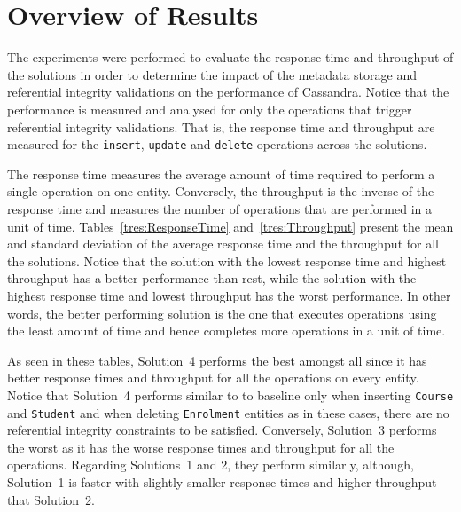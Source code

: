 \section{Overview of Results} \label{s:results-overview}


The experiments were performed to evaluate the response time and throughput of
the solutions in order to determine the impact of the metadata storage and
referential integrity validations on the performance of Cassandra. Notice that
the performance is measured and analysed for only the operations that trigger
referential integrity validations. That is, the response
time and throughput are measured for the \texttt{insert}, \texttt{update} and
\texttt{delete} operations across the solutions.

The response time measures the average amount of time required to perform a
single operation on one entity. Conversely,  the throughput is the inverse of
the response time and measures the number of operations that are performed in a
unit of time. Tables~\ref{tres:ResponseTime} and~\ref{tres:Throughput} present
the mean and standard deviation of the average response time and the throughput
 for all the solutions.  Notice that
the solution with the lowest response time and highest throughput has a better
performance than rest,  while the solution with the highest response time and
lowest throughput has the worst performance. In other words, the better
performing solution is the one that executes  operations using the least
amount of time and hence completes more operations in a unit of time.



As seen in these tables,  Solution~4 performs the best amongst all since it has
better  response times and throughput for all the  operations on every entity.
Notice that Solution~4 performs similar to to baseline only when inserting
\texttt{Course} and \texttt{Student} and when deleting \texttt{Enrolment}
entities as  in these cases, there are no  referential integrity constraints to
be satisfied. Conversely, Solution~3 performs the worst as it has the worse
response times  and throughput for all the operations.
Regarding Solutions~1 and 2,  they perform similarly, although, Solution~1 is
faster with slightly smaller response times and higher throughput that
Solution~2.



